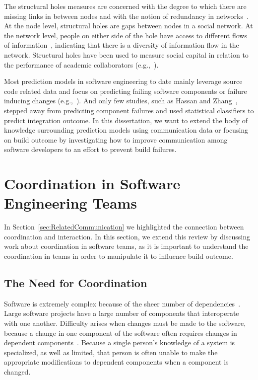 The structural holes measures are concerned with the degree to which there
are missing links in between nodes and with the notion of redundancy in
networks~\cite{Burt:1995vo}. At the node level, structural holes are gaps between
nodes in a social network. At the network level, people on either side of the
hole have access to different flows of information~\cite{Hargadon:1997asq},
indicating that there is a diversity of information flow in the network.
Structural holes have been used to measure social capital in relation to the
performance of academic collaborators (e.g.,~\cite{Brambila:PICMET2007}).

Most prediction models in software engineering to date mainly leverage source
code related data and focus on predicting failing software components or failure
inducing changes
(e.g.,~\cite{bell:2005tse,schroeter:isese:2006,zimmermann:icse:2008,kim:2008tse}).
And only few studies, such as Hassan and Zhang~\cite{hassan:ase:2006}, stepped away
from predicting component failures and used statistical classifiers to predict
integration outcome.
In this dissertation, we want to extend the body of knowledge surrounding prediction models using communication data or focusing on build outcome by investigating how to improve communication among software developers to an effort to prevent build failures.



\section{Coordination in Software Engineering Teams}
In Section~\ref{sec:RelatedCommunication} we highlighted the connection between coordination and interaction.
In this section, we extend this review by discussing work about coordination in software teams, as it is important to understand the coordination in teams in order to manipulate it to influence build outcome.

\vspace{-5pt}
\subsection{The Need for Coordination}
\vspace{-5pt}
Software is extremely complex because of the sheer number of dependencies~\cite{sawyer2004:teams}.
Large software projects have a large number of components that interoperate with one another.
Difficulty arises when changes must be made to the software, because a change in one component of the software often requires changes in dependent components~\cite{desouza:2008}. Because a single person's knowledge of a system is specialized, as well as limited, that person is often unable to make the appropriate modifications to dependent components when a component is changed.

